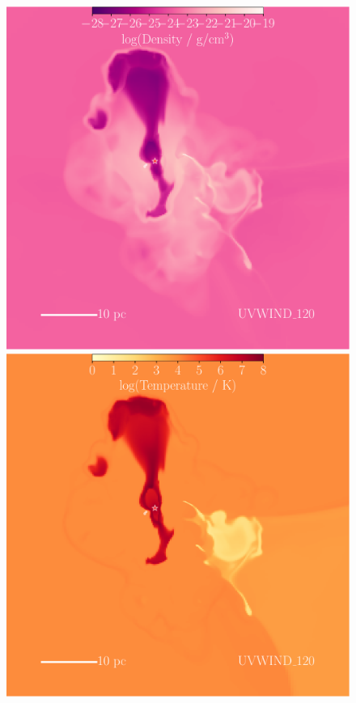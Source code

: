 \documentclass[a4paper,fleqn,usenatbib]{mnras}
\begin{document}
\begin{figure}
	\centerline{\includegraphics[width=0.80\columnwidth]{../plots/vis/slice/sliceTime_rho_windset_120Msun0p2Myr_zoom0p5__ywindonly.pdf} \includegraphics[width=0.80\columnwidth]{../plots/vis/slice/sliceTime_T_windset_120Msun0p2Myr_zoom0p5__ywindonly.pdf}}

\end{figure}
\end{document}

